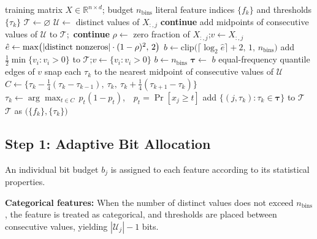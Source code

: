 \documentclass[journal,twoside,web]{ieeecolor}
\begin{document}
\begin{algorithm}[t]
\caption{GLADE binariser (fitting).}
\label{alg:glade}
\begin{algorithmic}[1]
\REQUIRE training matrix $X\in\mathbb{R}^{n\times d}$; budget $n_\text{bins}$
\ENSURE literal feature indices $\{f_k\}$ and thresholds $\{\tau_k\}$
\STATE $\mathcal{T}\gets\varnothing$ 
  \STATE $\mathcal{U}\gets$ distinct values of $X_{:,j}$
    \STATE \textbf{continue} 
    \STATE add midpoints of consecutive values of $\mathcal{U}$ to $\mathcal{T}$;\ \textbf{continue} 
  \ENDIF
  \STATE $\rho\gets$ zero fraction of $X_{:,j}$;\quad $v\gets X_{:,j}$
    
    \STATE $\hat e\gets\max\!\big(|{\rm distinct\ nonzeros}|\cdot(1-\rho)^2,\,2\big)$
    \STATE $b\gets\mathrm{clip}\!\big(\lceil\log_2\hat e\rceil+2,\,1,\,n_\text{bins}\big)$
    \STATE add $\tfrac12\min\{v_i:v_i>0\}$ to $\mathcal{T}$;\quad $v\gets\{v_i:v_i>0\}$
  \ELSE
    \STATE $b\gets n_\text{bins}$ 
  \ENDIF
  \STATE $\boldsymbol{\tau}\gets$ $b$ equal-frequency quantile edges of $v$ 
    
    \STATE snap each $\tau_k$ to the nearest midpoint of consecutive values of $\mathcal{U}$
  \ENDIF
    
    \STATE $C\gets\big\{\tau_k-\tfrac14(\tau_k-\tau_{k-1}),\ \tau_k,\ \tau_k+\tfrac14(\tau_{k+1}-\tau_k)\big\}$
    \STATE $\tau_k\gets\arg\max_{t\in C}\,p_t(1-p_t)$,\ \ $p_t=\Pr[x_j\ge t]$
  \ENDFOR
  \STATE add $\{(j,\tau_k):\tau_k\in\boldsymbol{\tau}\}$ to $\mathcal{T}$
\ENDFOR
\RETURN $\mathcal{T}$ as $\big(\{f_k\},\{\tau_k\}\big)$
\end{algorithmic}
\end{algorithm}

\subsection{Step 1: Adaptive Bit Allocation}
\label{subsec:budget}

An individual bit budget $b_j$ is assigned to each feature according
to its statistical properties.

\textbf{Categorical features:} When the number of distinct values
does not exceed $n_\text{bins}$, the feature is treated as
categorical, and thresholds are placed between consecutive values,
yielding $|\mathcal{U}_j| - 1$ bits.
\end{document}
